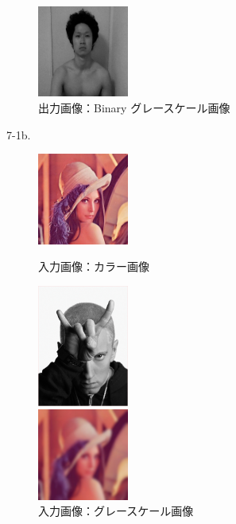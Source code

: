 \documentclass[10pt,a4paper]{jsarticle}
\begin{document}
\begin{figure}[htbp]
\begin{minipage}{0.25\hsize}
\begin{center}
      \includegraphics[width=30mm]{copied_bina_gray.jpg}
    \end{center}
    \caption{出力画像：Binary グレースケール画像}
    \label{fig:sutehage}
  \end{minipage}
\end{figure}

7-1b.
\begin{figure}[htbp]
  \begin{minipage}{0.25\hsize}
    \begin{center}
      \includegraphics[width=30mm]{lenna256x256binary.jpg}
    \end{center}
    \caption{入力画像：カラー画像}
    \label{fig:sutehage}
  \end{minipage}
  \begin{minipage}{0.25\hsize}
    \begin{center}
      \includegraphics[width=30mm]{EMINEM_201310A.jpg}
    \end{center}
    \caption{入力画像：グレースケール画像}
    \label{fig:sutehage}
  \end{minipage}
  \begin{minipage}{0.25\hsize}
    \begin{center}
      \includegraphics[width=30mm]{FilteredImageColor30.jpg}
    \end{center}


\end{minipage}
\end{figure}
\end{document}
